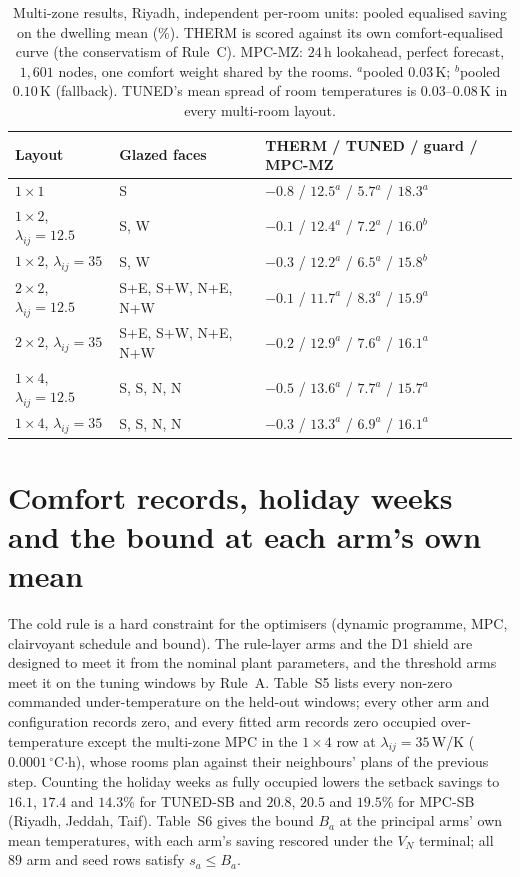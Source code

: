 \documentclass[11pt]{article}
\newcommand{\lij}{\lambda_{ij}}
\begin{document}
\begin{table}[!ht]
\centering
\caption{Multi-zone results, Riyadh, independent per-room units: pooled
equalised saving on the dwelling mean (\%). THERM is scored against its own
comfort-equalised curve (the conservatism of Rule~C). MPC-MZ: $24\,$h
lookahead, perfect forecast, $1{,}601$ nodes, one comfort weight shared by the
rooms. $^{a}$pooled $0.03\,$K; $^{b}$pooled $0.10\,$K (fallback).
TUNED's mean spread of room temperatures is $0.03$--$0.08\,$K in every multi-room layout.}
\label{tab:s-mz}
\small
\begin{tabularx}{\textwidth}{@{}llX@{}}
\toprule
Layout & Glazed faces & THERM / TUNED / guard / MPC-MZ \\
\midrule
$1\times1$ & S & $-0.8$ / $12.5^{a}$ / $5.7^{a}$ / $18.3^{a}$ \\
$1\times2$, $\lij=12.5$ & S, W & $-0.1$ / $12.4^{a}$ / $7.2^{a}$ / $16.0^{b}$ \\
$1\times2$, $\lij=35$ & S, W & $-0.3$ / $12.2^{a}$ / $6.5^{a}$ / $15.8^{b}$ \\
$2\times2$, $\lij=12.5$ & S+E, S+W, N+E, N+W & $-0.1$ / $11.7^{a}$ / $8.3^{a}$ / $15.9^{a}$ \\
$2\times2$, $\lij=35$ & S+E, S+W, N+E, N+W & $-0.2$ / $12.9^{a}$ / $7.6^{a}$ / $16.1^{a}$ \\
$1\times4$, $\lij=12.5$ & S, S, N, N & $-0.5$ / $13.6^{a}$ / $7.7^{a}$ / $15.7^{a}$ \\
$1\times4$, $\lij=35$ & S, S, N, N & $-0.3$ / $13.3^{a}$ / $6.9^{a}$ / $16.1^{a}$ \\
\bottomrule
\end{tabularx}
\end{table}

\section{Comfort records, holiday weeks and the bound at each arm's own mean}
\label{sec:s-comfort}

The cold rule is a hard constraint for the optimisers (dynamic programme, MPC, clairvoyant schedule and bound). The rule-layer arms and the D1 shield are designed to meet it from the nominal plant parameters, and the threshold arms meet it on the tuning windows by Rule~A. Table~S5 lists every non-zero commanded under-temperature on the held-out windows; every other arm and configuration records zero, and every fitted arm records zero occupied over-temperature except the multi-zone MPC in the $1\times4$ row at $\lij=35\,$W/K ($0.0001\,^\circ$C$\cdot$h), whose rooms plan against their neighbours' plans of the previous step. Counting the holiday weeks as fully occupied lowers the setback savings to $16.1$, $17.4$ and $14.3\%$ for TUNED-SB and $20.8$, $20.5$ and $19.5\%$ for MPC-SB (Riyadh, Jeddah, Taif). Table~S6 gives the bound $B_a$ at the principal arms' own mean temperatures, with each arm's saving rescored under the $V_N$ terminal; all $89$ arm and seed rows satisfy $s_a\le B_a$.
\end{document}
